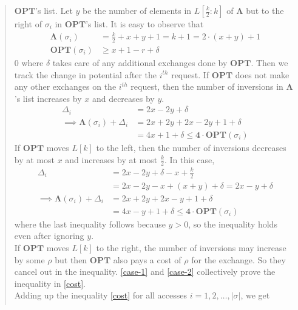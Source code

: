 \documentclass[11pt]{article}
\begin{document}
\begin{quote}
    $\mathbf{OPT}$'s list. Let $y$ be the number of elements in $L\left[ \frac{k}{2}:k \right]$ of $\mathbf{\Lambda}$ but to the
    right of $\sigma_{i}$ in $\mathbf{OPT}$'s list.
    It is easy to observe that
    \begin{align}
        \mathbf{\Lambda}(\sigma_{i}) &= \frac{k}{2} + x + y + 1 = k + 1 = 2 \cdot (x + y) + 1 \\
        \mathbf{OPT}(\sigma_{i}) &\geq x + 1 - r + \delta
    \end{align}0
    where $\delta$ takes care of any additional exchanges done by $\mathbf{OPT}$. Then we track the change in potential after the
    $i^{th}$ request. If $\mathbf{OPT}$ does not make any other exchanges on the $i^{th}$ request, then the number of inversions in
    $\mathbf{\Lambda}$'s list increases by $x$ and decreases by $y$.
    \begin{align}
        \Delta_{i} &= 2x - 2y + \delta \\
        \implies \mathbf{\Lambda}(\sigma_{i}) + \Delta_{i} &= 2x + 2y + 2x - 2y + 1 + \delta \\
        \label{case-1}
        &= 4x + 1 + \delta \leq \mathbf{4} \cdot \mathbf{OPT}(\sigma_{i})
    \end{align}
    If $\mathbf{OPT}$ moves $L[k]$ to the left, then the number of inversions decreases by at most $x$ and increases by at most
    $\frac{k}{2}$. In this case,
    \begin{align}
        \Delta_{i} &= 2x - 2y + \delta - x + \frac{k}{2} \\
        &= 2x - 2y - x + (x + y) + \delta = 2x - y + \delta \\
        \implies \mathbf{\Lambda}(\sigma_{i}) + \Delta_{i} &= 2x + 2y + 2x - y + 1 + \delta \\
        \label{case-2}
        &= 4x - y + 1 + \delta \leq \mathbf{4} \cdot \mathbf{OPT}(\sigma_{i})
    \end{align}
    where the last inequality follows because $y > 0$, so the inequality holds even after ignoring $y$. \\
    If $\mathbf{OPT}$ moves $L[k]$ to the right, the number of inversions may increase by some $\rho$ but then $\mathbf{OPT}$ also
    pays a cost of $\rho$ for the exchange. So they cancel out in the inequality. \eqref{case-1} and \eqref{case-2} collectively
    prove the inequality in \eqref{cost}. \\
    Adding up the inequality \eqref{cost} for all accesses $i = 1, 2, \hdots, |\sigma|$, we get
    \begin{align}

\end{align}
\end{quote}
\end{document}
